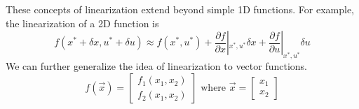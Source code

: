 \documentclass{article}
\begin{document}
These concepts of linearization extend beyond simple 1D functions. For example, the linearization of a 2D function is
$$f(x^*+\delta x, u^*+\delta u) \approx f(x^*, u^*)+\frac{\partial f}{\partial x}|_{x^*, u^*}\delta x+\frac{\partial f}{\partial u}|_{x^*, u^*}\delta u$$
We can further generalize the idea of linearization to vector functions.
\[
    f(\vec{x})=\left[
        \begin{array}{c}
            f_1(x_1, x_2)\\
            f_2(x_1, x_2)
        \end{array}
        \right] \text{ where } \vec{x} = \left[
            \begin{array}{c}
                x_1\\
                x_2
            \end{array}
            \right]
    \]
\end{document}
